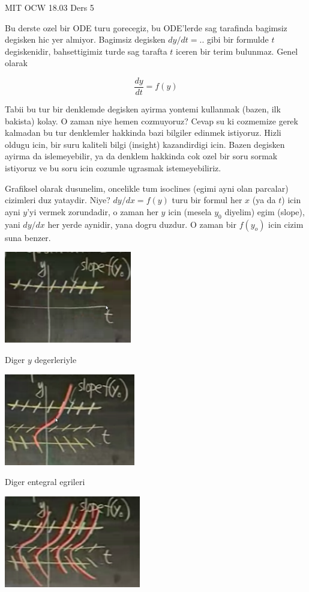 \documentclass[12pt,fleqn]{article}
\begin{document}
MIT OCW 18.03 Ders 5

Bu derste ozel bir ODE turu gorecegiz, bu ODE'lerde sag tarafinda bagimsiz
degisken hic yer almiyor. Bagimsiz degisken $dy/dt = ..$ gibi bir formulde
$t$ degiskenidir, bahsettigimiz turde sag tarafta $t$ iceren bir terim
bulunmaz. Genel olarak

\[ \frac{dy}{dt} = f(y) \]

Tabii bu tur bir denklemde degisken ayirma yontemi kullanmak (bazen, ilk
bakista) kolay. O zaman niye hemen cozmuyoruz? Cevap su ki cozmemize gerek
kalmadan bu tur denklemler hakkinda bazi bilgiler edinmek istiyoruz. Hizli
oldugu icin, bir suru kaliteli bilgi (insight) kazandirdigi icin. Bazen
degisken ayirma da islemeyebilir, ya da denklem hakkinda cok ozel bir soru
sormak istiyoruz ve bu soru icin cozumle ugrasmak istemeyebiliriz.

Grafiksel olarak dusunelim, oncelikle tum isoclines (egimi ayni olan
parcalar) cizimleri duz yataydir. Niye? $dy/dx = f(y)$ turu bir formul her
$x$ (ya da $t$) icin ayni $y$'yi vermek zorundadir, o zaman her $y$ icin (mesela $y_0$
diyelim) egim (slope), yani $dy/dx$ her yerde aynidir, yana dogru duzdur. O
zaman bir $f(y_o)$ icin cizim suna benzer.

\includegraphics[height=4cm]{5_1.png}

Diger $y$ degerleriyle

\includegraphics[height=4cm]{5_2.png}

Diger entegral egrileri

\includegraphics[height=4cm]{5_3.png}
\end{document}
